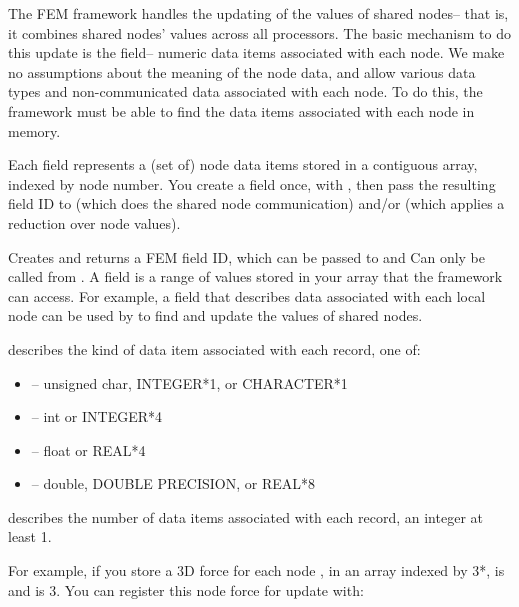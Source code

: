 \documentclass[10pt]{article}
\begin{document}
The FEM framework handles the updating of the values of shared nodes-- that
is, it combines shared nodes' values across all processors.  The basic
mechanism to do this update is the field-- numeric data items associated
with each node. We make no assumptions about the meaning of the node data,
and allow various data types and non-communicated data associated with each
node.  To do this, the framework must be able to find the data items
associated with each node in memory.

Each field represents a (set of) node data items stored in a contiguous array,
indexed by node number.  You create a field once, with ,
then pass the resulting field ID to  (which does the
shared node communication) and/or  (which applies a
reduction over node values).

    
    Creates and returns a FEM field ID, which can be passed to
 and   Can only be called from
.  A field is a range of values stored in your array that the framework
can access.  For example, a field that describes data associated with each local 
node can be used by  to find and update the values of 
shared nodes.

     describes the kind of data item associated with each
record, one of:

     \begin{itemize}
        \item {}-- unsigned char, INTEGER*1, or CHARACTER*1
        \item {}-- int or INTEGER*4
        \item {}-- float or REAL*4
        \item {}-- double, DOUBLE PRECISION, or REAL*8
     \end{itemize}

      describes the number of data items associated with each
record, an integer at least 1.

     For example, if you store a 3D force for each node , in an array
indexed by 3*,  is  and  is 3.
You can register this node force for update with:
\end{document}
